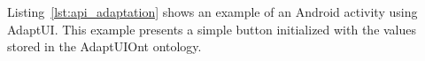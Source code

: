 Listing~\ref{lst:api_adaptation} shows an example of an Android activity using 
AdaptUI. This example presents a simple button initialized with the values 
stored in the AdaptUIOnt ontology.

\inputminted[linenos=true, fontsize=\footnotesize, frame=lines]{java}{4_system_architecture/api_adaptation.java}
